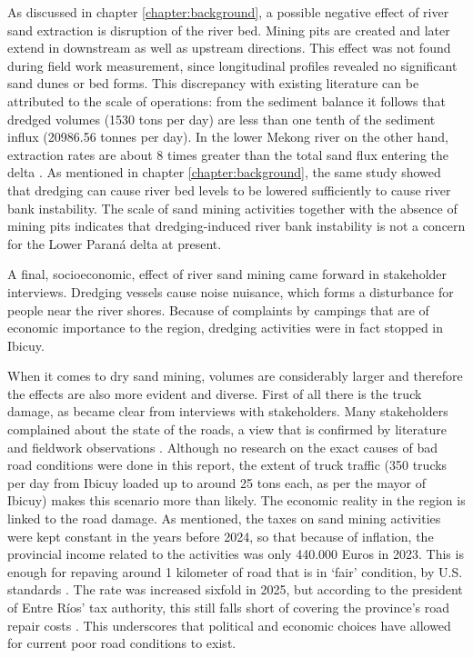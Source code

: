 As discussed in chapter \ref{chapter:background}, a possible negative effect of river sand extraction is disruption of the river bed. Mining pits are created and later extend in downstream as well as upstream directions. This effect was not found during field work measurement, since longitudinal profiles revealed no significant sand dunes or bed forms. This discrepancy with existing literature can be attributed to the scale of operations: from the sediment balance it follows that dredged volumes (1530 tons per day) are less than one tenth of the sediment influx (20986.56 tonnes per day). In the lower Mekong river on the other hand, extraction rates are about 8 times greater than the total sand flux entering the delta \autocite{hackneyRiverBankInstability2020}. As mentioned in chapter \ref{chapter:background}, the same study showed that dredging can cause river bed levels to be lowered sufficiently to cause river bank instability. The scale of sand mining activities together with the absence of mining pits indicates that dredging-induced river bank instability is not a concern for the Lower Paraná delta at present.

A final, socioeconomic, effect of river sand mining came forward in stakeholder interviews. Dredging vessels cause noise nuisance, which forms a disturbance for people near the river shores. Because of complaints by campings that are of economic importance to the region, dredging activities were in fact stopped in Ibicuy.

When it comes to dry sand mining, volumes are considerably larger and therefore the effects are also more evident and diverse. First of all there is the truck damage, as became clear from interviews with stakeholders. Many stakeholders complained about the state of the roads, a view that is confirmed by literature and fieldwork observations \autocite{fogliaSedArena2023} \autocite{novasImpactoAmbientalOculto2022}. Although no research on the exact causes of bad road conditions were done in this report, the extent of truck traffic (350 trucks per day from Ibicuy loaded up to around 25 tons each, as per the mayor of Ibicuy) makes this scenario more than likely. The economic reality in the region is linked to the road damage. As mentioned, the taxes on sand mining activities were kept constant in the years before 2024, so that because of inflation, the provincial income related to the activities was only 440.000 Euros in 2023. This is enough for repaving around 1 kilometer of road that is in `fair' condition, by U.S. standards \autocite{crumbCostRoadMaintenance2024}. The rate was increased sixfold in 2025, but according to the president of Entre Ríos’ tax authority, this still falls short of covering the province’s road repair costs \autocite{bellatoEntreRiosFrigerio2025}. This underscores that political and economic choices have allowed for current poor road conditions to exist.

